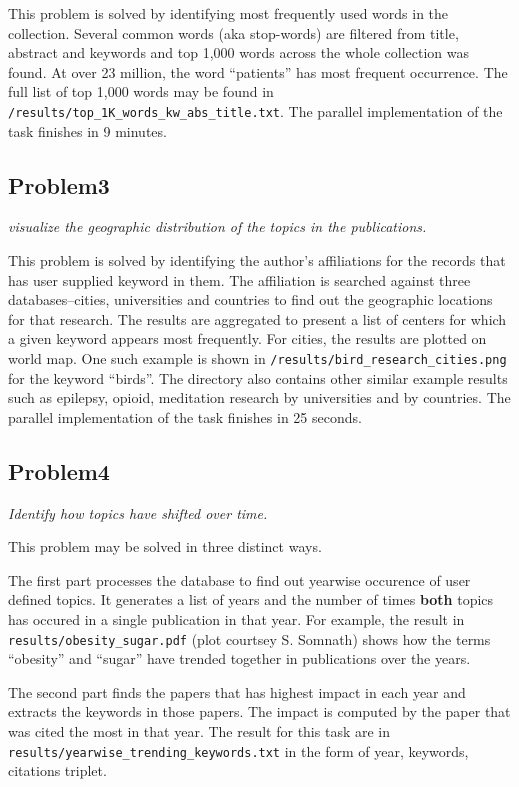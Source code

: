\documentclass{article}
\begin{document}
This problem is solved by identifying most frequently used words in the
collection. Several common words (aka stop-words) are filtered from title,
abstract and keywords and top 1,000 words across the whole collection was
found. At over 23 million, the word ``patients'' has most frequent occurrence.
The full list of top 1,000 words may be found in
\texttt{/results/top\_1K\_words\_kw\_abs\_title.txt}.  The parallel
implementation of the task finishes in 9 minutes.

\subsection*{Problem3}
\textit{visualize the geographic distribution of the topics in the publications.}

This problem is solved by identifying the author's affiliations for the records
that has user supplied keyword in them. The affiliation is searched against
three databases--cities, universities and countries to find out the geographic
locations for that research. The results are aggregated to present a list of
centers for which a given keyword appears most frequently. For cities, the
results are plotted on world map. One such example is shown in
\texttt{/results/bird\_research\_cities.png} for the keyword ``birds''. The
directory also contains other similar example results such as epilepsy, opioid,
meditation research by universities and by countries. The parallel
implementation of the task finishes in 25 seconds.

\subsection*{Problem4}
\textit{Identify how topics have shifted over time.}

This problem may be solved in three distinct ways.

The first part processes the database to find out yearwise occurence of user
defined topics. It generates a list of years and the number of times
\textbf{both} topics has occured in a single publication in that year. For
example, the result in \texttt{results/obesity\_sugar.pdf} (plot courtsey S.
Somnath) shows how the terms ``obesity'' and ``sugar'' have trended together in
publications over the years.

The second part finds the papers that has highest impact in each year and
extracts the keywords in those papers. The impact is computed by the paper that
was cited the most in that year. The result for this task are in
\texttt{results/yearwise\_trending\_keywords.txt} in the form of year,
keywords, citations triplet.
\end{document}
